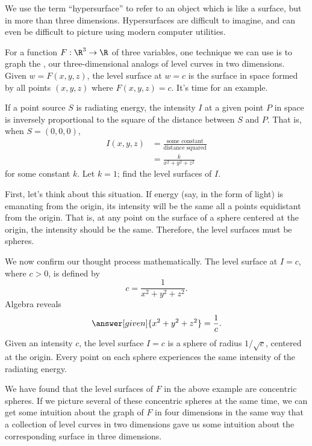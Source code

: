 \documentclass{ximera}
\begin{document}
We use the term ``hypersurface'' to refer to an object which is like a surface, but 
in more than three dimensions.  Hypersurfaces are difficult to imagine, and can 
even be difficult to picture using modern computer utilities. 

For a function $F: \R^3 \to \R$ of three variables, one technique we can use is to 
graph the , our three-dimensional analogs of level curves in 
two dimensions. Given $w=F(x,y,z)$, the level surface at $w=c$
is the surface in space formed by all points $(x,y,z)$ where
$F(x,y,z)=c$. It's time for an example.


\begin{example}
  If a point source $S$ is radiating energy, the intensity $I$ at a
  given point $P$ in space is inversely proportional to the square of
  the distance between $S$ and $P$. That is, when $S=(0,0,0)$,
  \begin{align*}
  I(x,y,z) &= \frac{\text{some constant}}{\text{distance squared}}\\
  &=\frac{k}{x^2+y^2+z^2}
  \end{align*}
  for some constant $k$.  Let $k=1$; find the level surfaces of $I$.
  \begin{explanation}
    First, let's think about this situation.  If energy (say, in the form of 
    light) is emanating from the origin,
    its intensity will be the same all a points equidistant from the
    origin. That is, at any point on the surface of a sphere centered
    at the origin, the intensity should be the same. Therefore, the
    level surfaces must be spheres.
    
    We now confirm our thought process mathematically. The level
    surface at $I=c$, where $c>0$, is defined by
    \[
    c = \frac{1}{x^2+y^2+z^2}.
    \]
    Algebra reveals
    \[
    \answer[given]{x^2+y^2+z^2} = \frac{1}{c}.
    \]
    Given an intensity $c$, the level surface $I=c$ is a sphere of
    radius $1/\sqrt{c}$, centered at the origin. Every point on each
    sphere experiences the same intensity of the radiating energy.
  
  \end{explanation}
\end{example}

    We have found that the level surfaces of $F$ in the above example 
    are concentric spheres. 
    If we picture several of these concentric spheres at the same time, we 
    can get some intuition about the graph of $F$ in four dimensions in the 
    same way that a collection of level curves in two dimensions gave us 
    some intuition about the corresponding surface in three dimensions.
\end{document}
